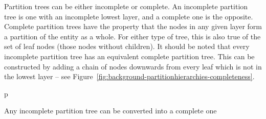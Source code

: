 
Partition trees can be either incomplete or complete. An incomplete partition tree is one with an incomplete lowest layer, and a complete one is the opposite. Complete partition trees have the property that the nodes in any given layer form a partition of the entity as a whole. For either type of tree, this is also true of the set of leaf nodes (those nodes without children). It should be noted that every incomplete partition tree has an equivalent complete partition tree. This can be constructed by adding a chain of nodes downwards from every leaf which is not in the lowest layer -- see Figure~\ref{fig:background-partitionhierarchies-completeness}.

\begin{stusubfig}{p}
	\hspace{4mm}%
\caption{Any incomplete partition tree can be converted into a complete one}
\label{fig:background-partitionhierarchies-completeness}
\end{stusubfig}

